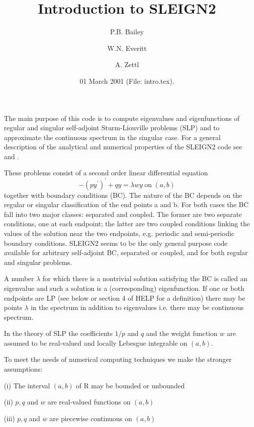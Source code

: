 \documentclass[12pt]{amsart}%
\theoremstyle{plain}
\numberwithin{equation}{section}
\numberwithin{theorem}{section}
\begin{document}
\title[Introduction to SLEIGN2]{Introduction to SLEIGN2}
\author{P.B. Bailey}
\author{W.N. Everitt}
\author{A. Zettl}
\address{Department of Mathematical Sciences, Northern Illinois University, DeKalb, IL
60115-2888, USA}
\date{01 March 2001 (File: intro.tex).}
\maketitle


The main purpose of this code is to compute eigenvalues and eigenfunctions of
regular and singular self-adjoint Sturm-Liouville problems (SLP) and to
approximate the continuous spectrum in the singular case. For a general
description of the analytical and numerical properties of the SLEIGN2 code see
\cite{BEZ} and \cite{BEZ3}.

These problems consist of a second order linear differential equation
\[
-(py^{\prime})^{\prime}+qy=\lambda wy\;\text{on}\;(a,b)
\]
together with boundary conditions (BC). The nature of the BC depends on the
regular or singular classification of the end points a and b. For both cases
the BC fall into two major classes: separated and coupled. The former are two
separate conditions, one at each endpoint; the latter are two coupled
conditions linking the values of the solution near the two endpoints, e.g.
periodic and semi-periodic boundary conditions. SLEIGN2 seems to be the only
general purpose code available for arbitrary self-adjoint BC, separated or
coupled, and for both regular and singular problems.

A number $\lambda$ for which there is a nontrivial solution satisfying the BC
is called an eigenvalue and such a solution is a (corresponding)
eigenfunction. If one or both endpoints are LP (see below or section 4 of HELP
for a definition) there may be points $\lambda$ in the spectrum in addition to
eigenvalues i.e. there may be continuous spectrum.

In the theory of SLP the coefficients $1/p$ and $q$ and the weight function
$w$ are assumed to be real-valued and locally Lebesgue integrable on $(a,b).$

To meet the needs of numerical computing techniques we make the stronger assumptions:

(i) The interval $(a,b)$ of R may be bounded or unbounded

(ii) $p,q$ and $w$ are real-valued functions on $(a,b)$

(iii) $p,q$ and $w$ are piecewise continuous on $(a,b)$
\end{document}
